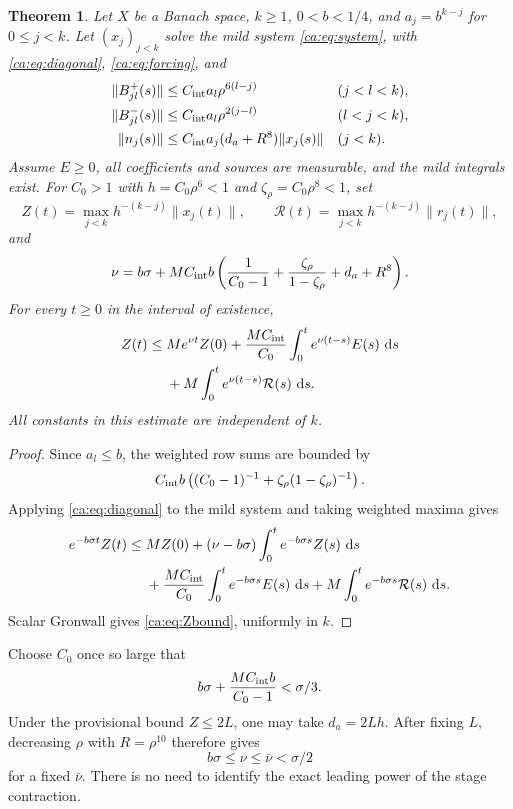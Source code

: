 \documentclass[11pt]{amsart}
\newtheorem{theorem}{Theorem}[section]
\theoremstyle{remark}
\numberwithin{equation}{section}
\newcommand{\dd}{\,\mathrm d}
\begin{document}
\begin{theorem}
\label{ca:thm:envelope}
Let $X$ be a Banach space, $k\ge1$, $0<b<1/4$, and
$a_j=b^{k-j}$ for $0\le j<k$.
Let $(x_j)_{j<k}$ solve the mild system \eqref{ca:eq:system}, with
\eqref{ca:eq:diagonal}, \eqref{ca:eq:forcing}, and
\[
 \begin{aligned}
 \|B^+_{jl}(s)\|&\le C_{\rm int}a_l\rho^{6(l-j)} &&(j<l<k),\\
 \|B^-_{jl}(s)\|&\le C_{\rm int}a_l\rho^{2(j-l)} &&(l<j<k),\\
 \|n_j(s)\|&\le C_{\rm int}a_j(d_a+R^8)\|x_j(s)\| &&(j<k).
 \end{aligned}
\]
Assume $E\ge0$, all coefficients and sources are measurable, and the mild
integrals exist. For $C_0>1$ with $h=C_0\rho^6<1$ and
$\zeta_\rho=C_0\rho^8<1$, set
\[
 Z(t)=\max_{j<k}h^{-(k-j)}\|x_j(t)\|,\qquad
 \mathcal R(t)=\max_{j<k}h^{-(k-j)}\|r_j(t)\|,
\]
and
\begin{equation}\label{ca:eq:nu}
 \nu=b\sigma+MC_{\rm int}b
 \left(\frac1{C_0-1}+\frac{\zeta_\rho}{1-\zeta_\rho}+d_a+R^8\right).
\end{equation}
For every $t\ge0$ in the interval of existence,
\begin{equation}\label{ca:eq:Zbound}
 \begin{split}
 Z(t)\le{}&Me^{\nu t}Z(0)
 +\frac{MC_{\rm int}}{C_0}\int_0^t e^{\nu(t-s)}E(s)\,\dd s\\
 &+M\int_0^t e^{\nu(t-s)}\mathcal R(s)\,\dd s.
 \end{split}
\end{equation}
All constants in this estimate are independent of $k$.
\end{theorem}
\begin{proof}
Since $a_l\le b$, the weighted row sums are bounded by
\[
 C_{\rm int}b\left((C_0-1)^{-1}
       +\zeta_\rho(1-\zeta_\rho)^{-1}\right).
\]
Applying \eqref{ca:eq:diagonal} to the mild system and taking
weighted maxima gives
\[
 \begin{split}
 e^{-b\sigma t}Z(t)\le{}&MZ(0)
       +(\nu-b\sigma)\int_0^t e^{-b\sigma s}Z(s)\,\dd s\\
 &+\frac{MC_{\rm int}}{C_0}\int_0^t e^{-b\sigma s}E(s)\,\dd s
       +M\int_0^t e^{-b\sigma s}\mathcal R(s)\,\dd s.
 \end{split}
\]
Scalar Gronwall gives \eqref{ca:eq:Zbound}, uniformly in $k$.
\end{proof}

Choose $C_0$ once so large that
\begin{equation}\label{ca:eq:gap}
 b\sigma+\frac{MC_{\rm int}b}{C_0-1}<\sigma/3.
\end{equation}
Under the provisional bound $Z\leq2L$, one may take $d_a=2Lh$.
After fixing $L$, decreasing $\rho$ with $R=\rho^{10}$ therefore gives
\[
 b\sigma\leq\nu\leq\bar\nu<\sigma/2
\]
for a fixed $\bar\nu$. There is no need to identify the exact leading
power of the stage contraction.
\end{document}
